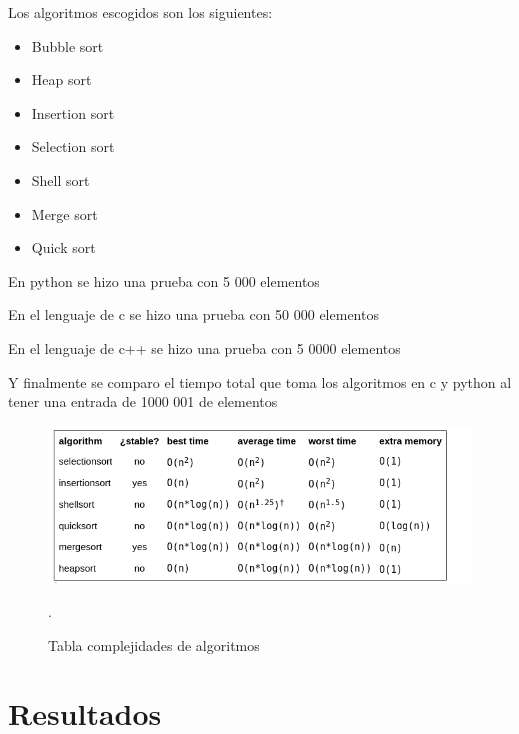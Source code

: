 \documentclass[a4paper]{article}
\begin{document}
Los algoritmos escogidos son los siguientes:

\begin{itemize}


\item  Bubble sort

\item Heap sort

\item Insertion sort

\item Selection sort

\item Shell sort

\item  Merge sort

\item Quick sort

\end{itemize}





En python se hizo una prueba con 5 000 elementos

En el lenguaje de c se hizo una prueba con 50 000 elementos 

En el lenguaje de c++ se hizo una prueba con 5 0000 elementos 

Y finalmente se comparo el tiempo total que toma los algoritmos en c y python al tener una entrada de 1000 001 de elementos 





\begin{figure}[H]%

\centering
\includegraphics[width=15cm]{imagenes/tabla.png}
\caption{Tabla complejidades de algoritmos\cite{mas}}.

\end{figure}





\section{Resultados}
\end{document}
